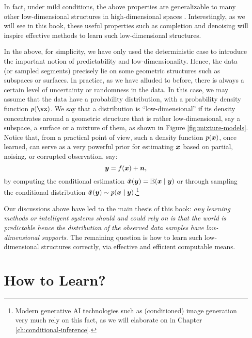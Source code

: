 \documentclass[\toplevelprefix/book-main.tex]{subfiles}
\begin{document}
In fact, under mild conditions, the above properties are generalizable to many other low-dimensional structures in high-dimensional spaces \cite{Wright-Ma-2022}. Interestingly, as we will see in this book, these useful properties such as completion and denoising will inspire effective methods to learn such low-dimensional structures. 

In the above, for simplicity, we have only used the deterministic case to introduce the important notion of predictability and low-dimensionality. Hence, the data (or sampled segments) precisely lie on some geometric structures such as subspaces or surfaces. In practice, as we have alluded to before, there is always a certain level of uncertainty or randomness in the data. In this case, we may assume that the data have a probability distribution, with a probability density function $p(\vx)$. We say that a distribution is ``low-dimensional'' if its density concentrates around a geometric structure that is rather low-dimensional, say a subspace, a surface or a mixture of them, as shown in Figure \ref{fig:mixture-models}. Notice that, from a practical point of view, such a density function $p(\bm{x})$, once learned, can serve as a very powerful prior for estimating $\bm{x}$ based on partial, noising, or corrupted observation, say: 
\begin{equation}
\bm{y} = f(\bm{x}) + \boldsymbol{n},
\end{equation}
by computing the conditional estimation $\hat{\bm{x}}(\bm{y}) = \mathbb{E}(\bm{x} \mid \bm{y})$ or through sampling the conditional distribution $\hat{\bm{x}}(\bm{y}) \sim p(\bm{x}\mid \bm{y})$.\footnote{Modern generative AI technologies such as (conditioned) image generation very much rely on this fact, as we will elaborate on in Chapter \ref{ch:conditional-inference}.}

Our discussions above have led to the main thesis of this book: {\em any learning methods or intelligent systems should and could rely on is that the world is predictable hence the distribution of the observed data samples have low-dimensional supports.} The remaining question is how to learn such low-dimensional structures correctly, via effective and efficient computable means. 

\section{How to Learn?}
\end{document}

